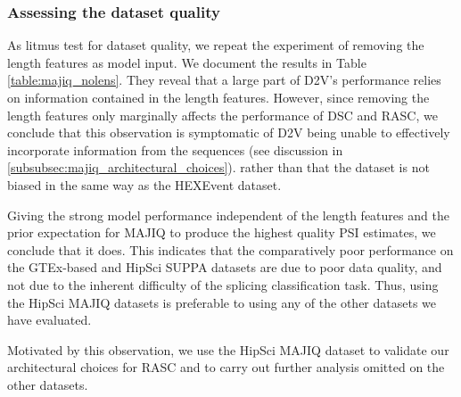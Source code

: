 \subsubsection{Assessing the dataset quality}

\begin{table}[h!]
	\centering
	\caption{
		Performance on the sensory neuron cell-based HipSci MAJIQ dataset with and without length features given. 
	}
	\label{table:majiq_nolens}
\end{table}

As litmus test for dataset quality, we repeat the experiment of removing the length features as model input. We document the results in Table \ref{table:majiq_nolens}.
They reveal that a large part of D2V's performance relies on information contained in the length features. However, since removing the length features only marginally affects the performance of DSC and RASC, we conclude that this observation is symptomatic of D2V being unable to effectively incorporate information from the sequences (see discussion in \ref{subsubsec:majiq_architectural_choices}). rather than that the dataset is not biased in the same way as the HEXEvent dataset.  

Giving the strong model performance independent of the length features and the prior expectation for MAJIQ to produce the highest quality PSI estimates, we conclude that it does. This indicates that the comparatively poor performance on the GTEx-based and HipSci SUPPA datasets are due to poor data quality, and not due to the inherent difficulty of the splicing classification task. Thus, using the HipSci MAJIQ datasets is preferable to using any of the other datasets we have evaluated. 

Motivated by this observation, we use the HipSci MAJIQ dataset to validate our architectural choices for RASC and to carry out further analysis omitted on the other datasets.





